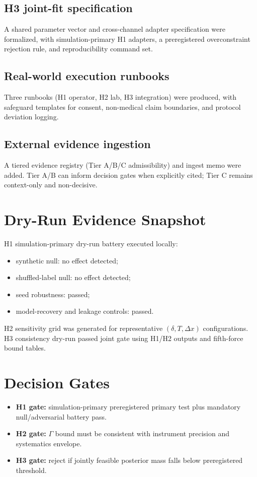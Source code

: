 \documentclass[11pt]{article}
\begin{document}
\subsection{H3 joint-fit specification}
A shared parameter vector and cross-channel adapter specification were formalized, with simulation-primary H1 adapters, a preregistered overconstraint rejection rule, and reproducibility command set.

\subsection{Real-world execution runbooks}
Three runbooks (H1 operator, H2 lab, H3 integration) were produced, with safeguard templates for consent, non-medical claim boundaries, and protocol deviation logging.

\subsection{External evidence ingestion}
A tiered evidence registry (Tier A/B/C admissibility) and ingest memo were added. Tier A/B can inform decision gates when explicitly cited; Tier C remains context-only and non-decisive.

\section{Dry-Run Evidence Snapshot}
H1 simulation-primary dry-run battery executed locally:
\begin{itemize}
    \item synthetic null: no effect detected;
    \item shuffled-label null: no effect detected;
    \item seed robustness: passed;
    \item model-recovery and leakage controls: passed.
\end{itemize}
H2 sensitivity grid was generated for representative $(\delta, T, \Delta x)$ configurations.
H3 consistency dry-run passed joint gate using H1/H2 outputs and fifth-force bound tables.

\section{Decision Gates}
\begin{itemize}
    \item \textbf{H1 gate:} simulation-primary preregistered primary test plus mandatory null/adversarial battery pass.
    \item \textbf{H2 gate:} $\Gamma$ bound must be consistent with instrument precision and systematics envelope.
    \item \textbf{H3 gate:} reject if jointly feasible posterior mass falls below preregistered threshold.
\end{itemize}
\end{document}
